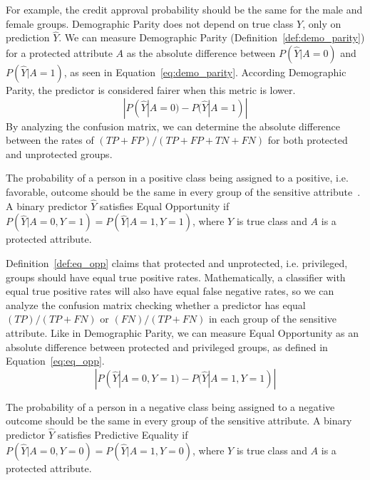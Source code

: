 For example, the credit approval probability should be the same for the male and female groups. Demographic Parity does not depend on true class $Y$, only on prediction $\hat{Y}$. We can measure Demographic Parity (Definition~\ref{def:demo_parity}) for a protected attribute $A$ as the absolute difference between $P(\hat{Y}|A=0)$ and $P(\hat{Y}|A=1)$, as seen in Equation~\ref{eq:demo_parity}. According Demographic Parity, the predictor is considered fairer when this metric is lower.
\begin{equation}\label{eq:demo_parity}
    |P(\hat{Y}|A=0)-P(\hat{Y}|A=1)|
\end{equation}
By analyzing the confusion matrix, we can determine the absolute difference between the rates of $(TP + FP)/(TP + FP + TN + FN)$ for both protected and unprotected groups.

\begin{definition}\label{def:eq_opp}
The probability of a person in a positive class being assigned to a positive, i.e. favorable, outcome should be the same in every group of the sensitive attribute~\citep{Hardt2016}. A binary predictor $\hat{Y}$ satisfies Equal Opportunity if $P(\hat{Y}|A=0,Y=1) = P(\hat{Y}|A=1,Y=1)$, where $Y$ is true class and $A$ is a protected attribute.
\end{definition}

Definition~\ref{def:eq_opp} claims that protected and unprotected, i.e. privileged, groups should have equal true positive rates. Mathematically, a classifier with equal true positive rates will also have equal false negative rates, so we can analyze the confusion matrix checking whether a predictor has equal $(TP)/(TP + FN)$ or $(FN)/(TP + FN)$ in each group of the sensitive attribute. Like in Demographic Parity, we can measure Equal Opportunity as an absolute difference between protected and privileged groups, as defined in Equation~\ref{eq:eq_opp}.
\begin{equation}\label{eq:eq_opp}
    |P(\hat{Y}|A=0,Y=1)-P(\hat{Y}|A=1,Y=1)|
\end{equation}

\begin{definition}\label{def:pred_eq}
The probability of a person in a negative class being assigned to a negative outcome should be the same in every group of the sensitive attribute. A binary predictor $\hat{Y}$ satisfies Predictive Equality if $P(\hat{Y}|A=0,Y=0) = P(\hat{Y}|A=1,Y=0)$, where $Y$ is true class and $A$ is a protected attribute.
\end{definition}

